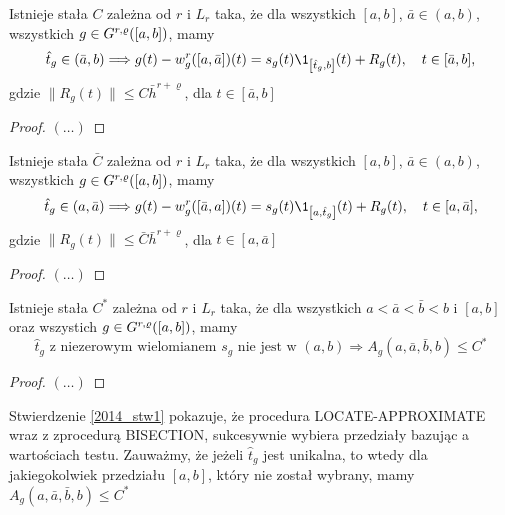 \documentclass[oik, pdftex, robocza, man]{mgrwms}
\begin{document}
\begin{lemma}
    Istnieje stała $C$ zależna od $r$ i $L_{r}$ taka, że dla wszystkich $[a,b]$, $\bar{a} \in (a,b)$, wszystkich $g \in G^{r,\varrho}([a,b])$, mamy
    \begin{equation*}
        \hat{t}_{g} \in(\bar{a}, b) \Longrightarrow g(t)-w_{g}^{r}([a, \bar{a}])(t)=s_{g}(t) \1_{\left[\hat{t}_{g}, b\right]}(t)+R_{g}(t), \quad t \in[\bar{a}, b],
    \end{equation*}
    gdzie $\| R_{g}(t) \| \leq C\bar{h}^{r+\varrho}$, dla $t \in [\bar{a}, b]$
\end{lemma}
\begin{proof}
    $(\dots)$
\end{proof}

\begin{cor}
    Istnieje stała $\bar{C}$ zależna od $r$ i $L_{r}$ taka, że dla wszystkich $[a,b]$, $\bar{a} \in (a,b)$, wszystkich $g \in G^{r,\varrho}([a,b])$, mamy
    \begin{equation*}
        \hat{t}_{g} \in (a,\bar{a}) \Longrightarrow g(t)-w_{g}^{r}([\bar{a},a])(t)=s_{g}(t) \1_{\left[a,\hat{t}_{g}\right]}(t)+R_{g}(t), \quad t \in[a,\bar{a}],
    \end{equation*}
    gdzie $\| R_{g}(t) \| \leq \bar{C}\bar{h}^{r+\varrho}$, dla $t \in [a,\bar{a}]$
\end{cor}
\begin{proof}
    $(\dots)$
\end{proof}

\begin{stw}
    \label{2014_stw1}
    Istnieje stała $C^{*}$ zależna od $r$ i $L_{r}$ taka, że dla wszystkich $a < \bar{a} < \bar{b} < b$ i $[a,b]$ oraz wszystich $g \in G^{r,\varrho}([a,b])$, mamy
    \begin{equation*}
        \hat{t}_{g} \text{ z niezerowym wielomianem } s_{g} \text{ nie jest w } (a,b) \Longrightarrow A_{g}(a, \bar{a}, \bar{b}, b) \leq C^{*}
    \end{equation*}
\end{stw}
\begin{proof}
    $(\dots)$
\end{proof}

\begin{uw}
    Stwierdzenie \ref{2014_stw1} pokazuje, że procedura LOCATE-APPROXIMATE wraz z zprocedurą BISECTION, sukcesywnie wybiera przedziały bazując a wartościach testu. Zauważmy, że jeżeli $\hat{t}_{g}$ jest unikalna, to wtedy dla jakiegokolwiek przedziału $[a,b]$, który nie został wybrany, mamy $A_{g}(a, \bar{a}, \bar{b}, b) \leq C^{*}$
\end{uw}
\end{document}
